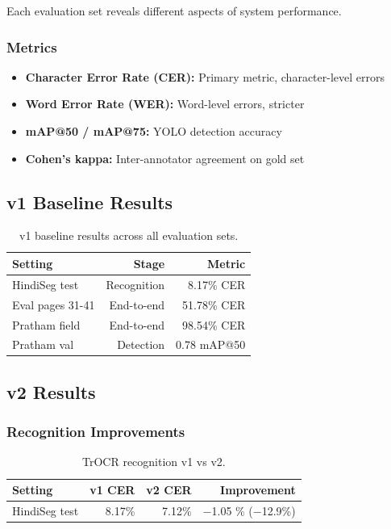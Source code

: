 \documentclass[14pt,a4paper]{article}
\begin{document}
Each evaluation set reveals different aspects of system performance.

\subsubsection{Metrics}

\begin{itemize}
    \item \textbf{Character Error Rate (CER):} Primary metric, character-level errors
    \item \textbf{Word Error Rate (WER):} Word-level errors, stricter
    \item \textbf{mAP@50 / mAP@75:} YOLO detection accuracy
    \item \textbf{Cohen's kappa:} Inter-annotator agreement on gold set
\end{itemize}

\subsection{v1 Baseline Results}

\begin{table}[h]
    \centering
    \begin{tabular}{lrr}
        \toprule
        \textbf{Setting} & \textbf{Stage} & \textbf{Metric} \\
        \midrule
        HindiSeg test & Recognition & 8.17\% CER \\
        Eval pages 31-41 & End-to-end & 51.78\% CER \\
        Pratham field & End-to-end & 98.54\% CER \\
        Pratham val & Detection & 0.78 mAP@50 \\
        \bottomrule
    \end{tabular}
    \caption{v1 baseline results across all evaluation sets.}
\end{table}

\subsection{v2 Results}

\subsubsection{Recognition Improvements}

\begin{table}[h]
    \centering
    \begin{tabular}{lrrr}
        \toprule
        \textbf{Setting} & \textbf{v1 CER} & \textbf{v2 CER} & \textbf{Improvement} \\
        \midrule
        HindiSeg test & 8.17\% & 7.12\% & $-$1.05 \% ($-$12.9\%) \\
        \bottomrule
    \end{tabular}
    \caption{TrOCR recognition v1 vs v2.}
\end{table}
\end{document}
